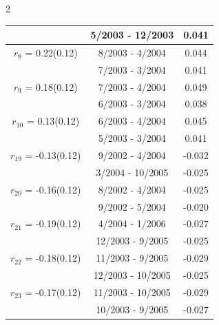 \begin{multicols}{2}
{\begin{tabular}{ccc}
&        5/2003 - 12/2003 &        0.041  \vspace{-.02in} \\ \hline 
  $r_{ 8}$ = 0.22(0.12) &       8/2003 -  4/2004 &        0.044   \vspace{-.10in} \\  
&        7/2003 -  3/2004 &        0.041  \vspace{-.02in} \\ \hline 
  $r_{ 9}$ = 0.18(0.12) &       7/2003 -  4/2004 &        0.049   \vspace{-.10in} \\  
&        6/2003 -  3/2004 &        0.038  \vspace{-.02in} \\ \hline 
  $r_{10}$ = 0.13(0.12) &       6/2003 -  4/2004 &        0.045   \vspace{-.10in} \\  
&        5/2003 -  3/2004 &        0.041  \vspace{-.02in} \\ \hline 
  $r_{19}$ = -0.13(0.12) &       9/2002 -  4/2004 &       -0.032    \vspace{-.10in} \\ 
  &        3/2004 - 10/2005 &       -0.025  \vspace{-.02in}   \\ \hline 
    $r_{20}$ = -0.16(0.12) &       8/2002 -  4/2004 &       -0.025    \vspace{-.10in} \\ 
  &        9/2002 -  5/2004 &       -0.020  \vspace{-.02in}   \\ \hline 
    $r_{21}$ = -0.19(0.12) &       4/2004 -  1/2006 &       -0.027    \vspace{-.10in} \\ 
  &       12/2003 -  9/2005 &       -0.025  \vspace{-.02in}   \\ \hline 
    $r_{22}$ = -0.18(0.12) &      11/2003 -  9/2005 &       -0.029    \vspace{-.10in} \\ 
  &       12/2003 - 10/2005 &       -0.025  \vspace{-.02in}   \\ \hline 
    $r_{23}$ = -0.17(0.12) &      11/2003 - 10/2005 &       -0.029    \vspace{-.10in} \\ 
  &       10/2003 -  9/2005 &       -0.027  \vspace{-.02in}   \\ \hline 

\end{tabular}}
\end{multicols}
